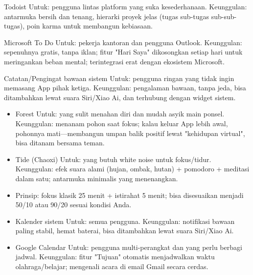 Todoist Untuk: pengguna lintas platform yang suka kesederhanaan. Keunggulan: antarmuka bersih dan tenang, hierarki proyek jelas (tugas sub-tugas sub-sub-tugas), poin karma untuk membangun kebiasaan.

Microsoft To Do Untuk: pekerja kantoran dan pengguna Outlook. Keunggulan: sepenuhnya gratis, tanpa iklan; fitur "Hari Saya" dikosongkan setiap hari untuk meringankan beban mental; terintegrasi erat dengan ekosistem Microsoft.

Catatan/Pengingat bawaan sistem Untuk: pengguna ringan yang tidak ingin memasang App pihak ketiga. Keunggulan: pengalaman bawaan, tanpa jeda, bisa ditambahkan lewat suara Siri/Xiao Ai, dan terhubung dengan widget sistem.


\begin{itemize}
  \item Forest Untuk: yang sulit menahan diri dan mudah asyik main ponsel. Keunggulan: menanam pohon saat fokus; kalau keluar App lebih awal, pohonnya mati—membangun umpan balik positif lewat "kehidupan virtual", bisa ditanam bersama teman.
  \item Tide (Chaoxi) Untuk: yang butuh white noise untuk fokus/tidur. Keunggulan: efek suara alami (hujan, ombak, hutan) + pomodoro + meditasi dalam satu; antarmuka minimalis yang menenangkan.
  \item Prinsip: fokus klasik 25 menit + istirahat 5 menit; bisa disesuaikan menjadi 50/10 atau 90/20 sesuai kondisi Anda.
\end{itemize}


\begin{itemize}
  \item Kalender sistem Untuk: semua pengguna. Keunggulan: notifikasi bawaan paling stabil, hemat baterai, bisa ditambahkan lewat suara Siri/Xiao Ai.
  \item Google Calendar Untuk: pengguna multi-perangkat dan yang perlu berbagi jadwal. Keunggulan: fitur "Tujuan" otomatis menjadwalkan waktu olahraga/belajar; mengenali acara di email Gmail secara cerdas.
\end{itemize}


